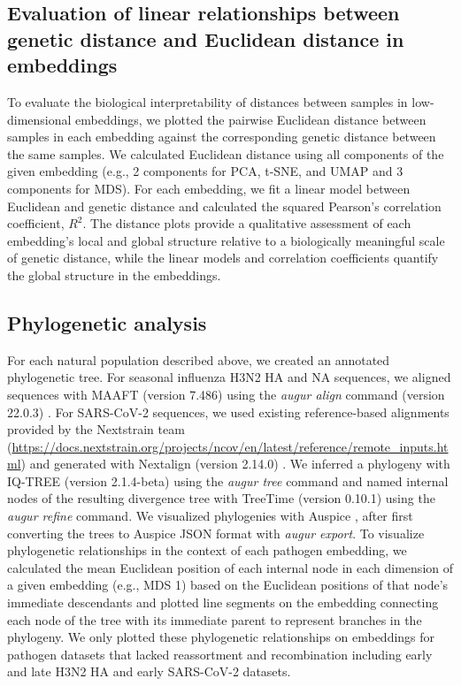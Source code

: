 \documentclass[10pt,letterpaper]{article}
\begin{document}
\subsection*{Evaluation of linear relationships between genetic distance and Euclidean distance in embeddings}

To evaluate the biological interpretability of distances between samples in low-dimensional embeddings, we plotted the pairwise Euclidean distance between samples in each embedding against the corresponding genetic distance between the same samples.
We calculated Euclidean distance using all components of the given embedding (e.g., 2 components for PCA, t-SNE, and UMAP and 3 components for MDS).
For each embedding, we fit a linear model between Euclidean and genetic distance and calculated the squared Pearson's correlation coefficient, $R^{2}$.
The distance plots provide a qualitative assessment of each embedding's local and global structure relative to a biologically meaningful scale of genetic distance, while the linear models and correlation coefficients quantify the global structure in the embeddings.

\subsection*{Phylogenetic analysis}

For each natural population described above, we created an annotated phylogenetic tree.
For seasonal influenza H3N2 HA and NA sequences, we aligned sequences with MAAFT (version 7.486) \cite{Katoh2002,Katoh2013} using the \textit{augur align} command (version 22.0.3) \cite{Huddleston2021}.
For SARS-CoV-2 sequences, we used existing reference-based alignments provided by the Nextstrain team (\href{https://docs.nextstrain.org/projects/ncov/en/latest/reference/remote_inputs.html#summary-of-available-genbank-open-files}{https://docs.nextstrain.org/projects/ncov/en/latest/reference/remote\_inputs.html}) and generated with Nextalign (version 2.14.0) \cite{Aksamentov2021}.
We inferred a phylogeny with IQ-TREE (version 2.1.4-beta) \cite{Nguyen2014} using the \textit{augur tree} command and named internal nodes of the resulting divergence tree with TreeTime (version 0.10.1) \cite{Sagulenko2018} using the \textit{augur refine} command.
We visualized phylogenies with Auspice \cite{Hadfield2018}, after first converting the trees to Auspice JSON format with \textit{augur export}.
To visualize phylogenetic relationships in the context of each pathogen embedding, we calculated the mean Euclidean position of each internal node in each dimension of a given embedding (e.g., MDS 1) based on the Euclidean positions of that node's immediate descendants and plotted line segments on the embedding connecting each node of the tree with its immediate parent to represent branches in the phylogeny.
We only plotted these phylogenetic relationships on embeddings for pathogen datasets that lacked reassortment and recombination including early and late H3N2 HA and early SARS-CoV-2 datasets.
\end{document}
